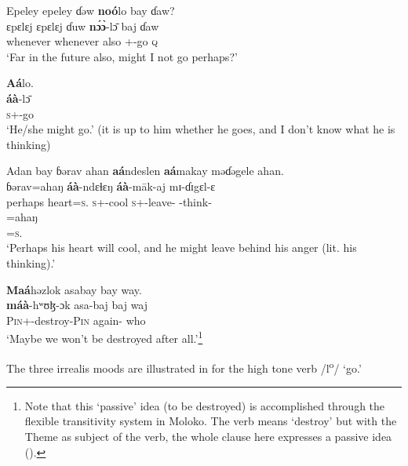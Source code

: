 \ea\label{ex:7:71}
Epeley  epeley  ɗəw  \textbf{noó}lo  bay  ɗaw?\\
\gll  ɛpɛlɛj  ɛpɛlɛj    ɗuw    \textbf{n\'ɔ\`ɔ}-l\=ɔ    baj  ɗaw\\
      whenever  whenever  also    {\oneS}+{\PBL}-go  {\NEG}  {\textsc{q}}\\
\glt  ‘Far in the future also, might I not go perhaps?’\\
\z 

\ea\label{ex:7:72}
\textbf{Aá}lo.\\
\gll  \textbf{áà}-l\=ɔ\\
      \textsc{s}+{\PBL}-go\\
\glt  ‘He/she might go.’ (it is up to him whether he goes, and I don’t know what he is thinking)\\
\z 

\ea\label{ex:7:73}
Adan  bay  ɓərav  ahan  \textbf{aá}ndeslen  \textbf{aá}makay  məɗəgele  ahan.\\
  ɓərav=ahaŋ    \textbf{áà}-ndɛɬɛŋ  \textbf{áà}-m\={a}k-aj    mɪ-ɗɪgɛl-ɛ\\  
      perhaps  heart=\textsc{s}.{\POSS}  \textsc{s}+{\PBL}{}-cool  \textsc{s}+{\PBL}{}-leave{}-{\CL} {\NOM}{}-think-{\CL}\\  
      
\medskip
\gll =ahaŋ\\
     =\textsc{s}.{\POSS}\\
\glt  ‘Perhaps his heart will cool, and he might leave behind his anger (lit. his thinking).’\\
\z 

\ea\label{ex:7:74}
\textbf{Maá}həzlok  asabay  bay  way.\\
\gll  \textbf{máà}-hʷʊɮ{}-ɔk      asa-baj    baj  waj\\
      \textsc{Pin}+{\PBL}{}-destroy-\textsc{Pin}  again-{\NEG}  {\NEG}  who\\
\glt  ‘Maybe we won’t be destroyed after all.’\footnote{Note that this ‘passive’ idea (to be destroyed) is accomplished through the flexible transitivity system in Moloko. The verb means ‘destroy’ but with the Theme as subject of the verb, the whole clause here expresses a passive idea (). }\\
\z  

The three irrealis moods are illustrated in  for the high tone verb /l\textsuperscript{o}/ ‘go.’

